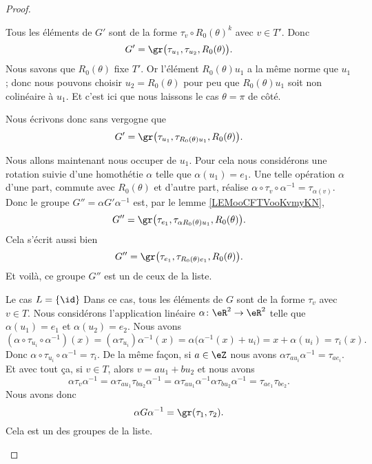 \begin{proof}
\begin{subproof}
		Tous les éléments de \( G'\) sont de la forme \( \tau_v\circ R_0(\theta)^k\) avec \( v\in T'\). Donc
		\begin{equation}        \label{EQooUUDQooQpRcIi}
			G'=\gr\big(\tau_{u_1}, \tau_{u_2}, R_0(\theta)\big).
		\end{equation}
		Nous savons que \( R_0(\theta)\) fixe \( T'\). Or l'élément \( R_0(\theta)u_1\) a la même norme que \( u_1\); donc nous pouvons choisir \( u_2=R_0(\theta)\) pour peu que \( R_0(\theta)u_1\) soit non colinéaire à \( u_1\). Et c'est ici que nous laissons le cas \( \theta=\pi\) de côté.

		Nous écrivons donc sans vergogne que
		\begin{equation}
			G'=\gr\big(\tau_{u_1}, \tau_{R_0(\theta)u_1}, R_0(\theta)\big).
		\end{equation}

		Nous allons maintenant nous occuper de \( u_1\). Pour cela nous considérons une rotation suivie d'une homothétie \( \alpha\) telle que \( \alpha(u_1)=e_1\). Une telle opération \( \alpha\) d'une part, commute avec \( R_0(\theta)\) et d'autre part, réalise \( \alpha\circ \tau_v\circ\alpha^{-1}=\tau_{\alpha(v)}\). Donc le groupe \( G''=\alpha G'\alpha^{-1}\) est, par le lemme \ref{LEMooCFTVooKvmyKN},
		\begin{equation}
			G''=\gr\big( \tau_{e_1}, \tau_{\alpha R_0(\theta)u_1}, R_0(\theta) \big).
		\end{equation}
		Cela s'écrit aussi bien
		\begin{equation}
			G''=\gr\big( \tau_{e_1}, \tau_{R_0(\theta)e_1}, R_0(\theta) \big).
		\end{equation}
		Et voilà, ce groupe \( G''\) est un de ceux de la liste.

		\item[Le cas \( L=\{ \id \}\)]
		Dans ce cas, tous les éléments de \( G\) sont de la forme \( \tau_v\) avec \( v\in T\). Nous considérons l'application linéaire \( \alpha\colon \eR^2\to \eR^2\) telle que \( \alpha(u_1)=e_1\) et \( \alpha(u_2)=e_2\). Nous avons
		\begin{equation}
			(\alpha\circ \tau_{u_i}\circ \alpha^{-1})(x)=(\alpha\tau_{u_i})\alpha^{-1}(x)=\alpha\big( \alpha^{-1}(x)+u_i \big)=x+\alpha(u_i)=\tau_i(x).
		\end{equation}
		Donc \( \alpha\circ \tau_{u_i}\circ \alpha^{-1}=\tau_i\). De la même façon, si \( a\in \eZ\) nous avons \( \alpha\tau_{au_i}\alpha^{-1}=\tau_{ae_i}\). Et avec tout ça, si \( v\in T\), alors \( v=au_1+bu_2\) et nous avons
		\begin{equation}
			\alpha\tau_v\alpha^{-1}=\alpha\tau_{au_1}\tau_{bu_2}\alpha^{-1}=\alpha\tau_{au_1}\alpha^{-1}\alpha\tau_{bu_2}\alpha^{-1}=\tau_{ae_1}\tau_{be_2}.
		\end{equation}
		Nous avons donc
		\begin{equation}
			\alpha G\alpha^{-1}=\gr(\tau_1,\tau_2).
		\end{equation}
		Cela est un des groupes de la liste.


\end{subproof}
\end{proof}
